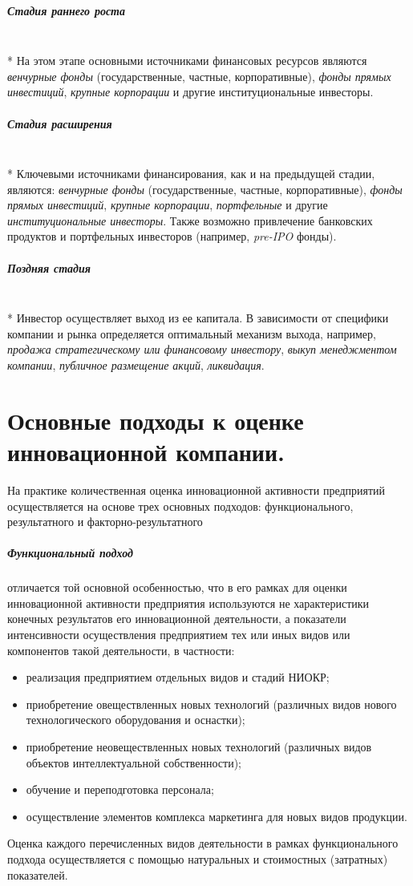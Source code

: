 \documentclass[11pt]{article}
\theoremstyle{plain} %
\theoremstyle{definition} %
\theoremstyle{remark} %
\begin{document}
\subparagraph{Стадия раннего роста} \\*
На этом этапе основными источниками финансовых ресурсов
являются \textit{венчурные фонды} (государственные, частные, корпоративные), \textit{фонды прямых
инвестиций}, \textit{крупные корпорации} и другие институциональные инвесторы.

\subparagraph{Стадия расширения} \\*
Ключевыми источниками
финансирования, как и на предыдущей стадии, являются: \textit{венчурные фонды}
(государственные, частные, корпоративные), \textit{фонды прямых
инвестиций}, \textit{крупные корпорации}, \textit{портфельные} и другие \textit{институциональные инвесторы}. Также возможно
привлечение банковских продуктов и портфельных инвесторов (например, \textit{pre-IPO}
фонды).

\subparagraph{Поздняя стадия} \\*
Инвестор осуществляет
выход из ее капитала. В зависимости от специфики компании и рынка определяется
оптимальный механизм выхода, например, \textit{продажа стратегическому или финансовому
инвестору}, \textit{выкуп менеджментом компании}, \textit{публичное размещение акций}, \textit{ликвидация}.
\newpage

\section{Основные подходы к оценке инновационной компании.}\label{erste}

На практике количественная оценка инновационной активности предприятий осуществляется на основе трех основных подходов: функционального, результатного и факторно-результатного

\subparagraph{Функциональный подход} отличается той основной особенностью, что в его рамках для оценки инновационной активности предприятия используются не характеристики конечных результатов его инновационной деятельности, а показатели интенсивности осуществления предприятием тех или иных видов или компонентов такой деятельности, в частности:
\begin{itemize}
	\item реализация предприятием отдельных видов и стадий НИОКР;
	\item приобретение овеществленных новых технологий (различных видов нового технологического оборудования и оснастки);
	\item приобретение неовеществленных новых технологий (различных видов объектов интеллектуальной собственности);
	\item обучение и переподготовка персонала;
	\item осуществление элементов комплекса маркетинга для новых видов продукции.
\end{itemize}
Оценка каждого перечисленных видов деятельности в рамках функционального подхода осуществляется с помощью натуральных и стоимостных (затратных) показателей.
\end{document}
